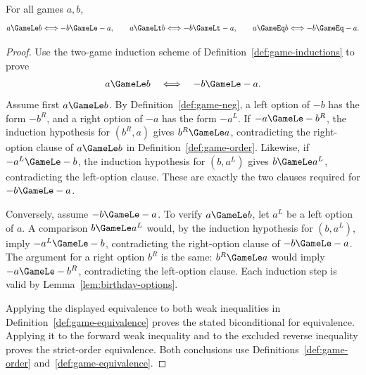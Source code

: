 \begin{theorem}
  \label{thm:game-neg-order}
  \leanok
  For all games \(a,b\),
  \[
    a\GameLe b\Longleftrightarrow -b\GameLe-a,
    \qquad
    a\GameLt b\Longleftrightarrow -b\GameLt-a,
    \qquad
    a\GameEq b\Longleftrightarrow -b\GameEq-a.
  \]
\end{theorem}
\begin{proof}
  \leanok
  Use the two-game induction scheme of Definition~\ref{def:game-inductions} to
  prove
  \[
    a\GameLe b\quad\Longleftrightarrow\quad -b\GameLe-a.
  \]
  Assume first \(a\GameLe b\).  By Definition~\ref{def:game-neg}, a left
  option of \(-b\) has the form \(-b^R\), and a right option of \(-a\) has
  the form \(-a^L\).  If \(-a\GameLe-b^R\), the induction hypothesis for
  \((b^R,a)\) gives \(b^R\GameLe a\), contradicting the right-option clause
  of \(a\GameLe b\) in Definition~\ref{def:game-order}.  Likewise, if
  \(-a^L\GameLe-b\), the induction hypothesis for \((b,a^L)\) gives
  \(b\GameLe a^L\), contradicting the left-option clause.  These are exactly
  the two clauses required for \(-b\GameLe-a\).

  Conversely, assume \(-b\GameLe-a\).  To verify \(a\GameLe b\), let
  \(a^L\) be a left option of \(a\).  A comparison \(b\GameLe a^L\) would,
  by the induction hypothesis for \((b,a^L)\), imply
  \(-a^L\GameLe-b\), contradicting the right-option clause of
  \(-b\GameLe-a\).  The argument for a right option \(b^R\) is the same:
  \(b^R\GameLe a\) would imply \(-a\GameLe-b^R\), contradicting the
  left-option clause.  Each induction step is valid by
  Lemma~\ref{lem:birthday-options}.

  Applying the displayed equivalence to both weak inequalities in
  Definition~\ref{def:game-equivalence} proves the stated biconditional for equivalence.
  Applying it to the forward weak
  inequality and to the excluded reverse inequality proves the strict-order
  equivalence.  Both conclusions use
  Definitions~\ref{def:game-order} and~\ref{def:game-equivalence}.
\end{proof}

